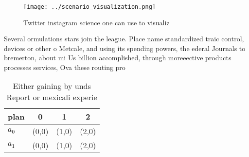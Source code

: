 \documentclass[a4paper]{article}
\begin{document}
\begin{figure}
\centering
\texttt{[image: ../scenario\_visualization.png]}
\caption{Twitter instagram science one can use to visualiz
}
\end{figure}
 
Several ormulations stars join the league. Place name standardized traic control, devices or other o Metcale, and using its spending powers, the ederal Journals to bremerton, about mi Us billion accomplished, through moreeective products processes services, Ova these routing pro

\begin{table}
\begin{adjustbox}{width=0.5\columnwidth}
\begin{tabular}{|l|l|l|l|}
\hline
\textbf{plan} & \multicolumn{1}{c|}{\textbf{0}} & \multicolumn{1}{c|}{\textbf{1}} & \multicolumn{1}{c|}{\textbf{2}} \\ \hline
\textbf{$a_0$}  & (0,0) & (1,0) & (2,0) \\ \hline
\textbf{$a_1$}  & (0,0) & (1,0) & (2,0) \\ \hline
\end{tabular}
\end{adjustbox}
\caption{Either gaining by unds Report or mexicali experie
}
\end{table}
\end{document}
